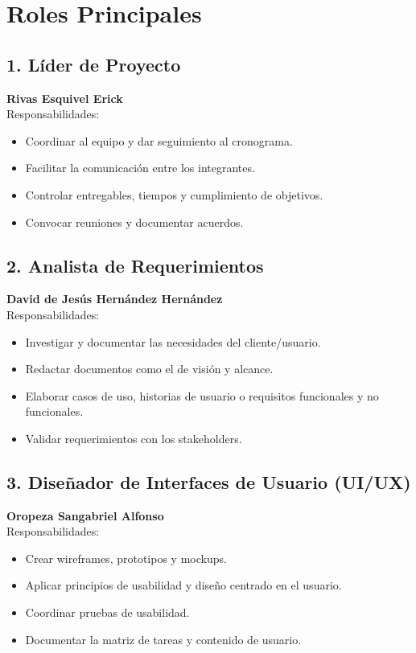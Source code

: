 \section{Roles Principales}
\begingroup
\small

\subsection*{1. Líder de Proyecto}
\textbf{Rivas Esquivel Erick}\\
Responsabilidades:
\begin{itemize}
    \item Coordinar al equipo y dar seguimiento al cronograma.
    \item Facilitar la comunicación entre los integrantes.
    \item Controlar entregables, tiempos y cumplimiento de objetivos.
    \item Convocar reuniones y documentar acuerdos.
\end{itemize}

\subsection*{2. Analista de Requerimientos}
\textbf{David de Jesús Hernández Hernández}\\
Responsabilidades:
\begin{itemize}
    \item Investigar y documentar las necesidades del cliente/usuario.
    \item Redactar documentos como el de visión y alcance.
    \item Elaborar casos de uso, historias de usuario o requisitos funcionales y no funcionales.
    \item Validar requerimientos con los stakeholders.
\end{itemize}

\subsection*{3. Diseñador de Interfaces de Usuario (UI/UX)}
\textbf{Oropeza Sangabriel Alfonso}\\
Responsabilidades:
\begin{itemize}
    \item Crear wireframes, prototipos y mockups.
    \item Aplicar principios de usabilidad y diseño centrado en el usuario.
    \item Coordinar pruebas de usabilidad.
    \item Documentar la matriz de tareas y contenido de usuario.
\end{itemize}

